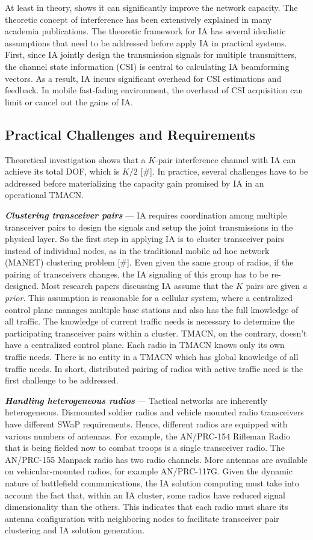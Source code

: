 \documentclass[letterpaper,11pt]{article}
\begin{document}
At least in theory, shows it can significantly improve the network capacity. The theoretic concept of interference has been extensively explained in many academia publications. The theoretic framework for IA has several idealistic assumptions that need to be addressed before apply IA in practical systems. First, since IA jointly design the transmission signals for multiple transmitters, the channel state information (CSI) is central to calculating IA beamforming vectors. As a result, IA incurs significant overhead for CSI estimations and feedback. In mobile fast-fading environment, the overhead of CSI acquisition can limit or cancel out the gains of IA. 

\subsection{Practical Challenges and Requirements}

Theoretical investigation shows that a $K$-pair interference channel with IA can achieve its total DOF, which is $K/2$ [\#].  In practice, several challenges have to be addressed before materializing the capacity gain promised by IA in an operational TMACN.

{\textbf{\textit{Clustering transceiver pairs}}} --- IA requires coordination among multiple transceiver pairs to design the signals and setup the joint transmissions in the physical layer. So the first step in applying IA is to cluster transceiver pairs instead of individual nodes, as in the traditional mobile ad hoc network (MANET) clustering problem  [\#]. Even given the same group of radios, if the pairing of transceivers changes, the IA signaling of this group has to be re-designed. Most research papers discussing IA assume that the $K$ pairs are given {\it{a prior}}. This assumption is reasonable for a cellular system, where a centralized control plane manages multiple base stations and also has the full knowledge of all traffic. The knowledge of current traffic needs is necessary to determine the participating transceiver pairs within a cluster. TMACN, on the contrary, doesn't have a centralized control plane. Each radio in TMACN knows only its own traffic needs. There is no entity in a TMACN which has global knowledge of all traffic needs. In short, distributed pairing of radios with active traffic need is the first challenge to be addressed.

{\textbf{\textit{Handling heterogeneous radios}}} ---  Tactical networks are inherently heterogeneous. Dismounted soldier radios and vehicle mounted radio transceivers have different SWaP requirements. Hence, different radios are equipped with various numbers of antennas. For example, the AN/PRC-154 Rifleman Radio that is being fielded now to combat troops is a single transceiver radio. The AN/PRC-155 Manpack radio has two radio channels. More antennas are available on vehicular-mounted radios, for example AN/PRC-117G. Given the dynamic nature of battlefield communications, the IA solution computing must take into account the fact that, within an IA cluster, some radios have reduced signal dimensionality than the others. This indicates that each radio must share its antenna configuration with neighboring nodes to facilitate transceiver pair clustering and IA solution generation. 
\end{document}
